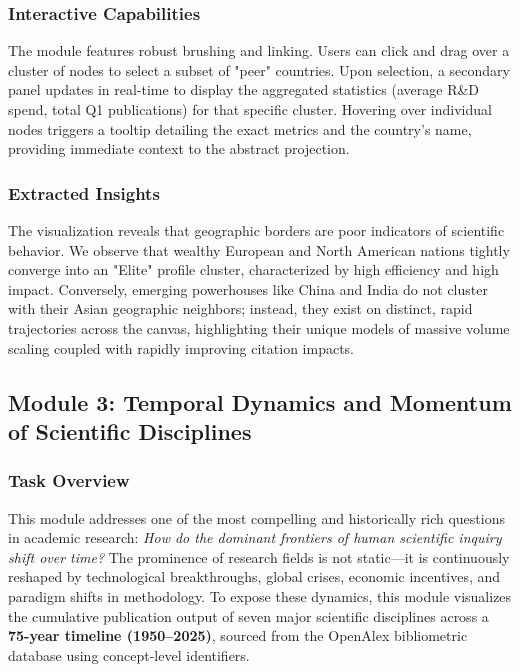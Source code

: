\documentclass[12pt,a4paper]{article}
\begin{document}
\subsubsection{Interactive Capabilities}
The module features robust brushing and linking. Users can click and drag over a cluster of nodes to select a subset of "peer" countries. Upon selection, a secondary panel updates in real-time to display the aggregated statistics (average R\&D spend, total Q1 publications) for that specific cluster. Hovering over individual nodes triggers a tooltip detailing the exact metrics and the country's name, providing immediate context to the abstract projection.

\subsubsection{Extracted Insights}
The visualization reveals that geographic borders are poor indicators of scientific behavior. We observe that wealthy European and North American nations tightly converge into an "Elite" profile cluster, characterized by high efficiency and high impact. Conversely, emerging powerhouses like China and India do not cluster with their Asian geographic neighbors; instead, they exist on distinct, rapid trajectories across the canvas, highlighting their unique models of massive volume scaling coupled with rapidly improving citation impacts.




\subsection{Module 3: Temporal Dynamics and Momentum of Scientific Disciplines}

\subsubsection{Task Overview}
This module addresses one of the most compelling and historically rich questions in academic
research: \textit{How do the dominant frontiers of human scientific inquiry shift over time?}
The prominence of research fields is not static---it is continuously reshaped by technological
breakthroughs, global crises, economic incentives, and paradigm shifts in methodology. To
expose these dynamics, this module visualizes the cumulative publication output of seven
major scientific disciplines across a \textbf{75-year timeline (1950--2025)}, sourced from
the OpenAlex bibliometric database using concept-level identifiers.
\end{document}

